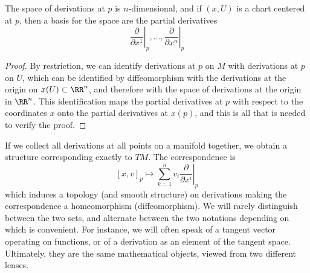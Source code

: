 \begin{theorem}
    The space of derivations at $p$ is $n$-dimensional, and if $(x,U)$ is a chart centered at $p$, then a basis for the space are the partial derivatives
    \[ \left.\frac{\partial}{\partial x^1}\right|_p, \dots, \left.\frac{\partial}{\partial x^n}\right|_p \]
\end{theorem}
\begin{proof}
    By restriction, we can identify derivations at $p$ on $M$ with derivations at $p$ on $U$, which can be identified by diffeomorphism with the derivations at the origin on $x(U) \subset \RR^n$, and therefore with the space of derivations at the origin in $\RR^n$. This identification maps the partial derivatives at $p$ with respect to the coordinates $x$ onto the partial derivatives at $x(p)$, and this is all that is needed to verify the proof.
\end{proof}

If we collect all derivations at all points on a manifold together, we obtain a structure corresponding exactly to $TM$. The correspondence is
%
\[ [x,v]_p \mapsto \sum_{k = 1}^n v_i \left.\frac{\partial}{\partial x^i}\right|_p \]
%
which induces a topology (and smooth structure) on derivations making the correspondence a homeomorphism (diffeomorphism). We will rarely distinguish between the two sets, and alternate between the two notations depending on which is convenient. For instance, we will often speak of a tangent vector operating on functions, or of a derivation as an element of the tangent space. Ultimately, they are the same mathematical objects, viewed from two different lenses.

